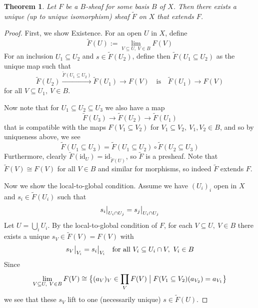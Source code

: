 \documentclass{scrartcl}
\newcommand\restr[2]{{
    \left.\kern-\nulldelimiterspace
    #1
    \vphantom{\big|}
    \right|_{#2}
}}
\newtheorem{theorem}[prop]{Theorem}
\theoremstyle{definition}
\begin{document}
\begin{theorem}
    \label{prop:extend_b_sheaves}
    Let $F$ be a $B$-sheaf for some basis $B$ of $X$.
    Then there exists a unique (up to unique isomorphism) sheaf $\tilde{F}$ on $X$ that extends $F$.
\end{theorem}
\begin{proof}
    First, we show Existence. For an open $U$ in $X$, define
    \begin{equation*}
        \tilde{F}(U) := \lim_{V \subseteq U, \ V \in B} F(V)
    \end{equation*}
    For an inclusion $U_1 \subseteq U_2$ and $s \in \tilde{F}(U_2)$, define then $\tilde{F}(U_1 \subseteq U_2)$ as the unique map such that
    \begin{equation*}
        \tilde{F}(U_2) \overset{\tilde{F}(U_1 \subseteq U_2)}{\to} \tilde{F}(U_1) \to F(V) \quad \text{is} \quad \tilde{F}(U_1) \to F(V)
    \end{equation*}
    for all $V \subseteq U_1, \ V \in B$.
    
    Now note that for $U_1 \subseteq U_2 \subseteq U_3$ we also have a map
    \begin{equation*}
        \tilde{F}(U_3) \to \tilde{F}(U_2) \to \tilde{F}(U_1)
    \end{equation*}
    that is compatible with the maps $F(V_1 \subseteq V_2)$ for $V_1 \subseteq V_2, \ V_1, V_2 \in B$, and so by uniqueness above, we see
    \begin{equation*}
        \tilde{F}(U_1 \subseteq U_3) = \tilde{F}(U_1 \subseteq U_2) \circ \tilde{F}(U_2 \subseteq U_3)
    \end{equation*}
    Furthermore, clearly $\tilde{F}(\mathrm{id}_U) = \mathrm{id}_{\tilde{F}(U)}$, so $\tilde{F}$ is a presheaf.
    Note that $\tilde{F}(V) \cong F(V)$ for all $V \in B$ and similar for morphisms, so indeed $\tilde{F}$ extends $F$.

    Now we show the local-to-global condition.
    Assume we have $(U_i)_i$ open in $X$ and $s_i \in \tilde{F}(U_i)$ such that
    \begin{equation*}
        \restr{s_i}{U_i \cap U_j} = \restr{s_j}{U_i \cap U_j}
    \end{equation*}
    Let $U = \bigcup_i U_i$. 
    By the local-to-global condition of $F$, for each $ V \subseteq U, \ V \in B$ there exists a unique $s_V \in \tilde{F}(V) = F(V)$ with
    \begin{equation*}
        \restr{s_V}{V_i} = \restr{s_i}{V_i} \quad \text{for all $V_i \subseteq U_i \cap V, \ V_i \in B$}
    \end{equation*}
    Since
    \begin{equation*}
        \lim_{V \subseteq U, \ V \in B} F(V) \cong \bigl\{ (a_V)_V \in \prod_V F(V) \bigm| F(V_1 \subseteq V_2)(a_{V_2}) = a_{V_1} \bigr\}
    \end{equation*}
    we see that these $s_V$ lift to one (necessarily unique) $s \in \tilde{F}(U)$.


\end{proof}
\end{document}
